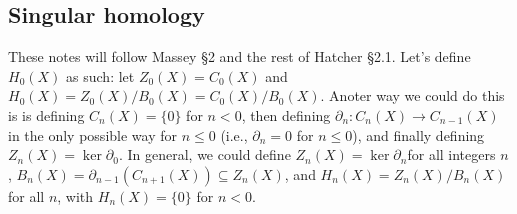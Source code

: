 \subsection{Singular homology}
These notes will follow Massey \S 2 and the rest of Hatcher \S 2.1.
\orbreak
Let's define $H_0(X)$ as such: let $Z_0(X)=C_0(X)$ and  $H_0(X)=Z_0(X) / B_0(X)=C_0(X) /B_0(X)$. Anoter way we could do this is is defining $C_n (X)=\{0\} $ for $n<0$, then defining $\partial _n \colon C_n (X) \to C_{n-1}(X)$ in the only possible way for $n\leq 0$ (i.e., $\partial _n =0$ for $n\leq 0$), and finally defining $Z_n (X)=\ker \partial_0 $. In general, we could define $Z_n (X)=\ker \partial_n  $for all integers $n$, $B_n (X)=\partial _{n-1}(C_{n+1}(X))\subseteq Z_n (X)$, and $H_n (X)=Z_n (X) / B_n (X)$ for all $n$, with $H_n (X)=\{0\} $ for $n<0$.

